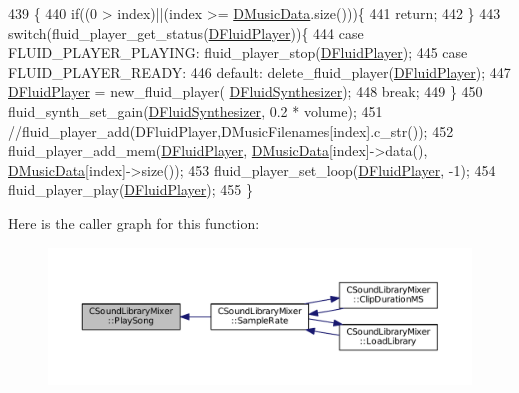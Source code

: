 \begin{DoxyCode}
439                                                         \{
440     \textcolor{keywordflow}{if}((0 > index)||(index >= \hyperlink{classCSoundLibraryMixer_a494744db8ea800dd1443418711183846}{DMusicData}.size()))\{
441         \textcolor{keywordflow}{return};   
442     \}
443     \textcolor{keywordflow}{switch}(fluid\_player\_get\_status(\hyperlink{classCSoundLibraryMixer_a6773ddf83ef86bc27598f6c5cee61d9c}{DFluidPlayer}))\{
444         \textcolor{keywordflow}{case} FLUID\_PLAYER\_PLAYING:  fluid\_player\_stop(\hyperlink{classCSoundLibraryMixer_a6773ddf83ef86bc27598f6c5cee61d9c}{DFluidPlayer});
445         \textcolor{keywordflow}{case} FLUID\_PLAYER\_READY:    
446         \textcolor{keywordflow}{default}:                    delete\_fluid\_player(\hyperlink{classCSoundLibraryMixer_a6773ddf83ef86bc27598f6c5cee61d9c}{DFluidPlayer});
447                                     \hyperlink{classCSoundLibraryMixer_a6773ddf83ef86bc27598f6c5cee61d9c}{DFluidPlayer} = new\_fluid\_player(
      \hyperlink{classCSoundLibraryMixer_a6c1663c381dbf2aa18c82a23141f409c}{DFluidSynthesizer});
448                                     \textcolor{keywordflow}{break};
449     \}
450     fluid\_synth\_set\_gain(\hyperlink{classCSoundLibraryMixer_a6c1663c381dbf2aa18c82a23141f409c}{DFluidSynthesizer}, 0.2 * volume);
451     \textcolor{comment}{//fluid\_player\_add(DFluidPlayer,DMusicFilenames[index].c\_str());}
452     fluid\_player\_add\_mem(\hyperlink{classCSoundLibraryMixer_a6773ddf83ef86bc27598f6c5cee61d9c}{DFluidPlayer}, \hyperlink{classCSoundLibraryMixer_a494744db8ea800dd1443418711183846}{DMusicData}[index]->data(), 
      \hyperlink{classCSoundLibraryMixer_a494744db8ea800dd1443418711183846}{DMusicData}[index]->size());
453     fluid\_player\_set\_loop(\hyperlink{classCSoundLibraryMixer_a6773ddf83ef86bc27598f6c5cee61d9c}{DFluidPlayer}, -1);
454     fluid\_player\_play(\hyperlink{classCSoundLibraryMixer_a6773ddf83ef86bc27598f6c5cee61d9c}{DFluidPlayer});
455 \}
\end{DoxyCode}
Here is the caller graph for this function\+:\nopagebreak
\begin{figure}[H]
\begin{center}
\leavevmode
\includegraphics[width=350pt]{classCSoundLibraryMixer_ad8fdd1f573967a8124cd4bc4a8c29ea1_icgraph}
\end{center}
\end{figure}
\hypertarget{classCSoundLibraryMixer_a48bf99193d92c07a5c5229d58a10d9fe}{}\label{classCSoundLibraryMixer_a48bf99193d92c07a5c5229d58a10d9fe} 
